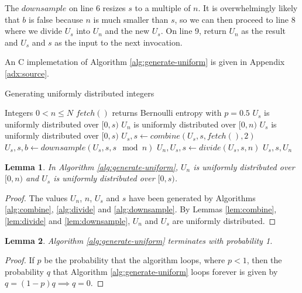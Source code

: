 \documentclass[12pt]{article}
\newtheorem{lemma}{Lemma}
\begin{document}
The $downsample$ on line 6 resizes $s$ to a multiple of $n$. It is overwhelmingly likely that $b$ is false because $n$ is much smaller than $s$, so we can then proceed to line 8 where we divide $U_s$ into $U_n$ and the new $U_s$. On line 9, return $U_n$ as the result and $U_s$ and $s$ as the input to the next invocation.

An C implemetation of Algorithm \ref{alg:generate-uniform} is given in Appendix \ref{adx:source}.

\begin{algorithm}
\caption{Generating uniformly distributed integers}
\label{alg:generate-uniform}
\begin{algorithmic}[1]
\Require Integers $0 < n\le N$
\Require $fetch()$ returns Bernoulli entropy with $p=0.5$
\Require $U_s$ is uniformly distributed over $[0,s)$
\Ensure $U_n$ is uniformly distributed over $[0,n)$
\Ensure $U_s$ is uniformly distributed over $[0,s)$
        \State $U_s, s \gets combine(U_s, s, fetch(), 2)$
    \EndWhile
    \State $U_s, s, b \gets downsample(U_s, s, s \mod n)$ 
        \State $U_n, U_s, s \gets divide(U_s, s, n)$
        \State \Return $U_s, s, U_n$
    \EndIf
  \EndWhile
\EndProcedure
\end{algorithmic}
\end{algorithm}

\begin{lemma}
    In Algorithm \ref{alg:generate-uniform}, 
$U_n$ is uniformly distributed over $[0,n)$ and 
$U_s$ is uniformly distributed over $[0,s)$.
\end{lemma}

\begin{proof}
The values $U_n$, $n$, $U_s$ and $s$ have been generated by Algorithms \ref{alg:combine}, \ref{alg:divide} and \ref{alg:downsample}. By Lemmas \ref{lem:combine}, \ref{lem:divide} and \ref{lem:downsample}, $U_n$ and $U_s$ are uniformly distributed.
\end{proof}

\begin{lemma}
Algorithm \ref{alg:generate-uniform} terminates with probability 1.
\end{lemma}

\begin{proof}
    If $p$ be the probability that the algorithm loops, where $p<1$, then the probability $q$ that Algorithm \ref{alg:generate-uniform} loops forever is given by $q = (1-p)q \implies q=0$.
\end{proof}
\end{document}
